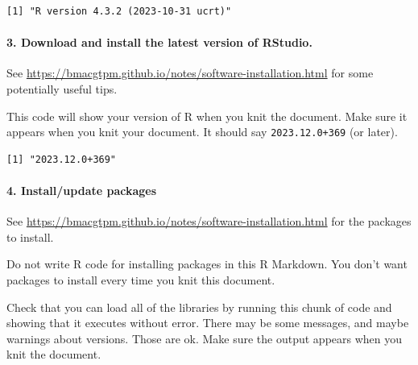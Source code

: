 \documentclass[
]{article}
\newenvironment{Shaded}{\begin{snugshade}}{\end{snugshade}}
\newcommand{\FunctionTok}[1]{\textcolor[rgb]{0.13,0.29,0.53}{\textbf{#1}}}
\newcommand{\NormalTok}[1]{#1}
\newcommand{\SpecialCharTok}[1]{\textcolor[rgb]{0.81,0.36,0.00}{\textbf{#1}}}
\begin{document}
\begin{Shaded}
\end{Shaded}

\begin{verbatim}
[1] "R version 4.3.2 (2023-10-31 ucrt)"
\end{verbatim}

\paragraph{3. Download and install the latest version of
RStudio.}\label{download-and-install-the-latest-version-of-rstudio.}

See \url{https://bmacgtpm.github.io/notes/software-installation.html}
for some potentially useful tips.

This code will show your version of R when you knit the document. Make
sure it appears when you knit your document. It should say
\texttt{2023.12.0+369} (or later).

\begin{Shaded}
\end{Shaded}

\begin{verbatim}
[1] "2023.12.0+369"
\end{verbatim}

\paragraph{4. Install/update packages}\label{installupdate-packages}

See \url{https://bmacgtpm.github.io/notes/software-installation.html}
for the packages to install.

Do not write R code for installing packages in this R Markdown. You
don't want packages to install every time you knit this document.

Check that you can load all of the libraries by running this chunk of
code and showing that it executes without error. There may be some
messages, and maybe warnings about versions. Those are ok. Make sure the
output appears when you knit the document.
\end{document}

